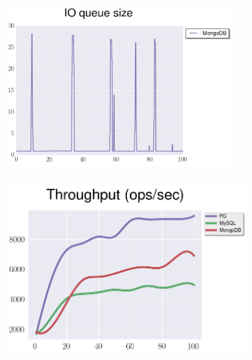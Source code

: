 \documentclass[usenames,dvipsnames, 18pt, compress, aspectratio=169]{beamer}
\begin{document}
\begin{frame}
    \frametitle{}
    \begin{center}
    \begin{figure}
        \includegraphics[width=0.75\textwidth,center]{benchmarks/mongodb_update_io_queue_size.png}
    \end{figure}
    \end{center}
\end{frame}


\begin{frame}
    \frametitle{}
    \begin{center}
    \vspace{10pt}
    \begin{figure}
        \includegraphics[width=0.8\textwidth,center]{benchmarks/insert_throughput_wal_size.png}
    \end{figure}
    \end{center}
\end{frame}
\end{document}
